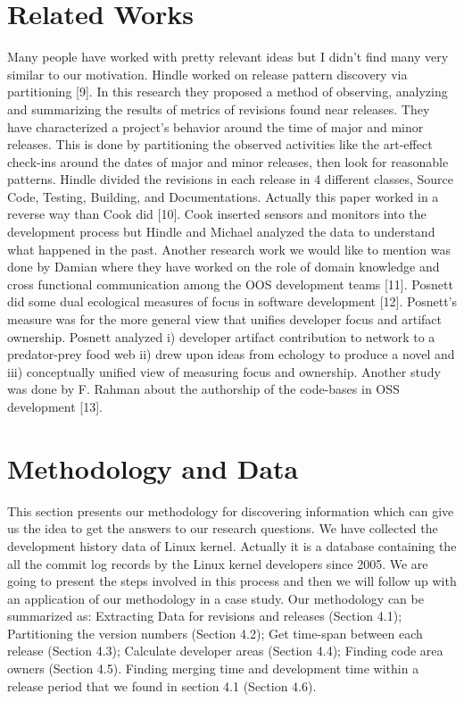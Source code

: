 \documentclass{acm_proc_article-sp}
\begin{document}
\section{Related Works}
Many people have worked with pretty relevant ideas but I didn't find many very similar to our motivation. Hindle worked on release pattern discovery via partitioning [9]. In this research they proposed a method of observing, analyzing and summarizing the results of metrics of revisions found near releases. They have characterized a project's behavior around the time of major and minor releases. This is done by partitioning the observed activities like the art-effect check-ins around the dates of major and minor releases, then look for reasonable patterns. Hindle divided the revisions in each release in 4 different classes, Source Code, Testing, Building, and Documentations. Actually this paper worked in a reverse way than Cook did [10]. Cook inserted sensors and monitors into the development process but Hindle and Michael analyzed the data to understand what happened in the past.
Another research work we would like to mention was done by  Damian where they have worked on the role of domain knowledge and cross functional communication among the OOS development teams [11]. Posnett did some dual ecological measures of focus in software development [12]. Posnett's measure was for the more general view that unifies developer focus and artifact ownership. Posnett analyzed i) developer artifact contribution to network to a predator-prey food web ii) drew upon ideas from echology to produce a novel and iii) conceptually unified view of measuring focus and ownership. Another study was done by F. Rahman about the authorship of the code-bases in OSS development [13].

\section{Methodology and Data}
This section presents our methodology for discovering information which can give us the idea to get the answers to our research questions. We have collected the development history data of Linux kernel. Actually it is a database containing the all the commit log records by the Linux kernel developers since 2005. We are going to present the steps involved in this process and then we will follow up with an application of our methodology in a case study.
Our methodology can be summarized as: Extracting Data for revisions and releases (Section 4.1); Partitioning the version numbers (Section 4.2); Get time-span between each release (Section 4.3); Calculate developer areas (Section 4.4); Finding code area owners (Section 4.5). Finding merging time and development time within a release period that we found in section 4.1 (Section 4.6). 
\end{document}

